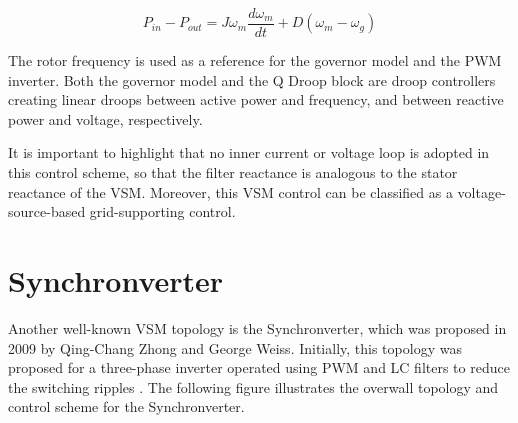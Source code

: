 \begin{equation*}
    P_{in} - P_{out} = J\omega_m \frac{d\omega_m}{dt} + D(\omega_m - \omega_g)
\end{equation*}

The rotor frequency is used as a reference for the governor model and the PWM
inverter. Both the governor model and the Q Droop block are droop controllers
creating linear droops between active power and frequency, and between reactive
power and voltage, respectively.

It is important to highlight that no inner current or voltage loop is adopted in
this control scheme, so that the filter reactance is analogous to the stator
reactance of the VSM. Moreover, this VSM control can be classified as a
voltage-source-based grid-supporting control.

\section{Synchronverter}\label{sec:synchronverter}

Another well-known VSM topology is the Synchronverter, which was proposed in
2009 by Qing-Chang Zhong and George Weiss. Initially, this topology was proposed
for a three-phase inverter operated using PWM and LC filters to reduce the
switching ripples \cite{zhong2011synchronverter}. The following figure
illustrates the overwall topology and control scheme for the Synchronverter.


